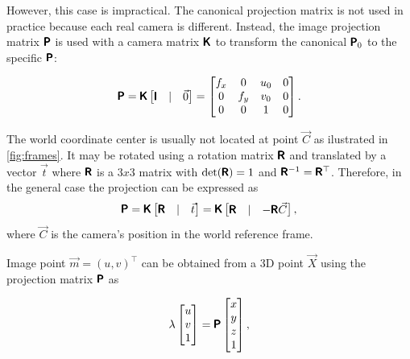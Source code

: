 However, this case is impractical. 
The canonical projection matrix is not used in practice because each real camera is different. 
Instead, the image projection matrix $\pmb{\mathsf{P}}$ is used with a camera matrix $\pmb{\mathsf{K}}$ to transform the canonical $\pmb{\mathsf{P}}_0$ to the specific $\pmb{\mathsf{P}}$:

\begin{equation}
\pmb{\mathsf{P}} = \pmb{\mathsf{K}} \begin{bmatrix} \pmb{\mathsf{I}} & | & \vec{0} \end{bmatrix} = 
    \begin{bmatrix} 
    f_x & 0 & u_0 & 0 \\
    0 & f_y & v_0 & 0 \\ 
    0 & 0 & 1 & 0 \\
    \end{bmatrix}.
\end{equation}

The world coordinate center is usually not located at point $\vec{C}$ as ilustrated in \autoref{fig:frames}. 
It may be rotated using a rotation matrix $\pmb{\mathsf{R}}$ and translated by a vector $\vec{t}$ where $\pmb{\mathsf{R}}$ is a $3x3$ matrix with $\det(\pmb{\mathsf{R}}) = 1$ and $\pmb{\mathsf{R}}^{-1} = \pmb{\mathsf{R}}^\top$. 
Therefore, in the general case the projection can be expressed as
\begin{equation}
    \label{eq:PKRt}
    \pmb{\mathsf{P}} = \pmb{\mathsf{K}} \begin{bmatrix} \pmb{\mathsf{R}} & | & \vec{t} \end{bmatrix} = 
    \pmb{\mathsf{K}} \begin{bmatrix} \pmb{\mathsf{R}} & | & - \pmb{\mathsf{R}} \vec{C} \end{bmatrix},
\end{equation}
where $\vec{C}$ is the camera's position in the world reference frame. 

Image point $\vec{m} = (u, v)^\top$ can be obtained from a 3D point $\vec{X}$ using the projection matrix $\pmb{\mathsf{P}}$ as

\begin{equation}
    \label{eq:projection}
    \lambda \begin{bmatrix} 
        u \\ v \\ 1 \end{bmatrix} = \pmb{\mathsf{P}} \begin{bmatrix} x \\ y \\ z \\ 1
    \end{bmatrix},
\end{equation}

